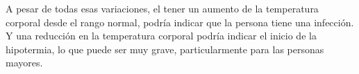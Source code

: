 	A pesar de todas esas variaciones, el tener un aumento de la temperatura corporal desde el rango normal, podría indicar que la persona tiene una infección. Y una reducción en la temperatura corporal podría indicar el inicio de la hipotermia, lo que puede ser muy grave, particularmente para las personas mayores. \cite{tempRCN}